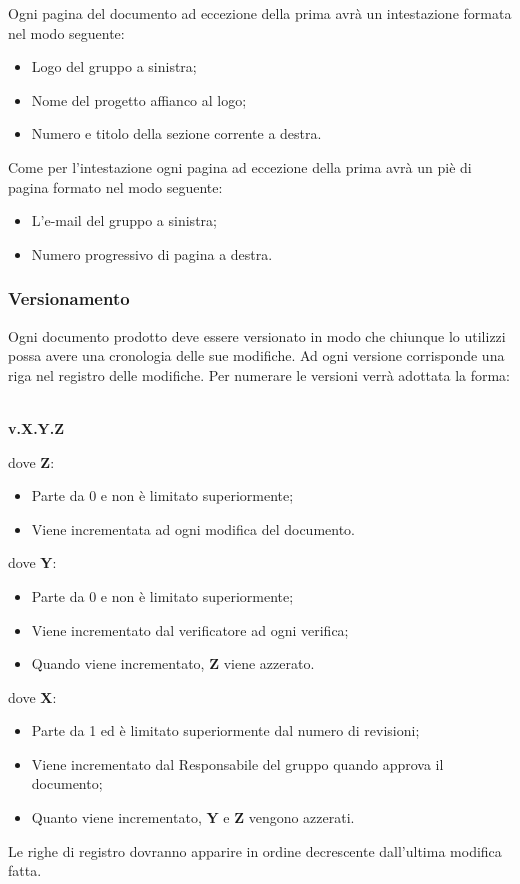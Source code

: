 \documentclass[a4paper,11pt]{article}
\begin{document}
				Ogni pagina del documento ad eccezione della prima avrà un intestazione formata nel modo seguente:
				\begin{itemize}
				\item Logo del  gruppo a sinistra;
				\item Nome del progetto affianco al logo;
				\item Numero e titolo della sezione corrente a destra.
	\end{itemize}			
				 Come per l'intestazione ogni pagina ad eccezione della prima avrà un piè di pagina formato nel modo seguente:
				 \begin{itemize}
				 \item L'e-mail del gruppo a sinistra;
				 \item Numero progressivo di pagina a destra.
	\end{itemize}			  
			\subsubsection{Versionamento}
			Ogni documento prodotto deve essere versionato in modo che chiunque lo utilizzi possa avere una cronologia delle sue modifiche. Ad ogni versione corrisponde una riga nel registro delle modifiche. Per numerare le versioni verrà adottata la forma: \
			\begin{center} \textbf{v.X.Y.Z} \end{center}
			
			dove \textbf{Z}:
			\begin{itemize}
			\item Parte da 0 e non è limitato superiormente;
			\item Viene incrementata ad ogni modifica del documento.
			\end{itemize}
			dove \textbf{Y}:
			\begin{itemize}
			\item Parte da 0 e non è limitato superiormente;
			\item Viene incrementato dal verificatore ad ogni verifica;
			\item Quando viene incrementato, \textbf{Z} viene azzerato.
			\end{itemize}
			dove \textbf{X}:
			\begin{itemize}
			\item Parte da 1 ed è limitato superiormente dal numero di revisioni;
			\item Viene incrementato dal Responsabile del gruppo quando approva il documento;
			\item Quanto viene incrementato, \textbf{Y} e \textbf{Z} vengono azzerati.
			\end{itemize}
			Le righe di registro dovranno apparire in ordine decrescente dall'ultima modifica fatta.
			
\end{document}

